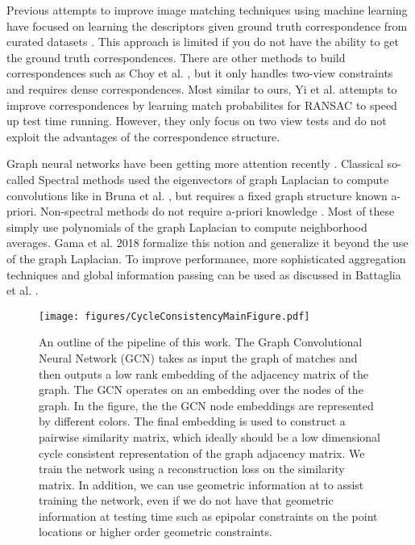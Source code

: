 \documentclass[10pt,twocolumn,letterpaper]{article}
\begin{document}
Previous attempts to improve image matching techniques using machine learning have focused on learning the descriptors given ground truth correspondence from curated datasets \cite{zagoruyko2015learning, yi2016lift, brachmann2017dsac}.
This approach is limited if you do not have the ability to get the ground truth correspondences.
There are other methods to build correspondences such as Choy et al. \cite{choy2016universal}, but it only handles two-view constraints and requires dense correspondences.
Most similar to ours, Yi et al. \cite{yi2018learning} attempts to improve correspondences by learning match probabilites for RANSAC to speed up test time running.
However, they only focus on two view tests and do not exploit the advantages of the correspondence structure.

Graph neural networks have been getting more attention recently \cite{bronstein2017geometric, bruna2013spectral, defferrard2016convolutional, kipf2016semi, scarselli2009graph, gama2018mimo, gama2018convolutional, battaglia2018relational}.
Classical so-called Spectral methods used the eigenvectors of graph Laplacian to compute convolutions like in Bruna et al. \cite{bruna2013spectral}, but requires a fixed graph structure known a-priori. 
Non-spectral methods do not require a-priori knowledge \cite{bronstein2017geometric, kipf2016semi, scarselli2009graph, gama2018convolutional}.
Most of these simply use polynomials of the graph Laplacian to compute neighborhood averages. Gama et al. 2018 \cite{gama2018mimo, gama2018convolutional} formalize this notion and generalize it beyond the use of the graph Laplacian.
To improve performance, more sophisticated aggregation techniques and global information passing can be used as discussed in Battaglia et al. \cite{battaglia2018relational}.

\begin{figure*}[t]
\begin{center}
  \texttt{[image: figures/CycleConsistencyMainFigure.pdf]}
\end{center}
  \caption{
    An outline of the pipeline of this work.
    The Graph Convolutional Neural Network (GCN) \cite{kipf2016semi} takes as input the graph of matches and then outputs a low rank embedding of the adjacency matrix of the graph.
    The GCN operates on an embedding over the nodes of the graph.
    In the figure, the the GCN node embeddings are represented by different colors.
    The final embedding is used to construct a pairwise similarity matrix, which ideally should be a low dimensional cycle consistent representation of the graph adjacency matrix.
    We train the network using a reconstruction loss on the similarity matrix.
    In addition, we can use geometric information at to assist training the network, even if we do not have that geometric information at testing time such as epipolar constraints on the point locations or higher order geometric constraints.
  }
\label{fig:pipeline}
\label{fig:onecol}
\end{figure*}
\end{document}
